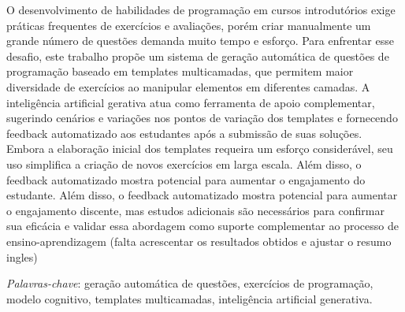\begin{resumo}
O desenvolvimento de habilidades de programação em cursos introdutórios exige práticas frequentes de exercícios e avaliações, porém criar manualmente um grande número de questões demanda muito tempo e esforço. Para enfrentar esse desafio, este trabalho propõe um sistema de geração automática de questões de programação baseado em templates multicamadas, que permitem maior diversidade de exercícios ao manipular elementos em diferentes camadas. A inteligência artificial gerativa atua como ferramenta de apoio complementar, sugerindo cenários e variações nos pontos de variação dos templates e fornecendo feedback automatizado aos estudantes após a submissão de suas soluções. Embora a elaboração inicial dos templates requeira um esforço considerável, seu uso simplifica a criação de novos exercícios em larga escala. Além disso, o feedback automatizado mostra potencial para aumentar o engajamento do estudante.  Além disso, o feedback automatizado mostra potencial para aumentar o engajamento discente, mas estudos adicionais são necessários para confirmar sua eficácia e validar essa abordagem como suporte complementar ao processo de ensino-aprendizagem  (falta acrescentar os resultados obtidos e ajustar o resumo ingles)
 
  \bigbreak

  \noindent
  \textit{Palavras-chave}: geração automática de questões, exercícios de programação, modelo cognitivo, templates multicamadas, inteligência artificial generativa.
\end{resumo}